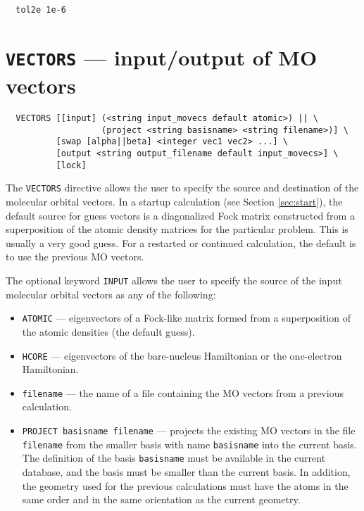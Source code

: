 \begin{verbatim}
  tol2e 1e-6
\end{verbatim}


\section{{\tt VECTORS} --- input/output of MO vectors}
\label{sec:vectors}


\begin{verbatim}
  VECTORS [[input] (<string input_movecs default atomic>) || \
                   (project <string basisname> <string filename>)] \
          [swap [alpha||beta] <integer vec1 vec2> ...] \
          [output <string output_filename default input_movecs>] \
          [lock]
\end{verbatim}

The \verb+VECTORS+ directive allows the user to specify the source and
destination of the molecular orbital vectors.  In a startup
calculation (see Section \ref{sec:start}), the default source for
guess vectors is a diagonalized Fock matrix constructed from a
superposition of the atomic density matrices for the particular
problem.  This is usually a very good guess.  For a restarted or
continued calculation, the default is to use the previous MO vectors.

The optional keyword \verb+INPUT+ allows the user to specify the
source of the input molecular orbital vectors as any of the following:
\begin{itemize}
\item \verb+ATOMIC+ --- eigenvectors of a Fock-like matrix formed from
  a superposition of the atomic densities (the default guess).
\item \verb+HCORE+ --- eigenvectors of the bare-nucleus Hamiltonian or
  the one-electron Hamiltonian.
\item \verb+filename+ --- the name of a file containing the MO vectors
  from a previous calculation.
\item \verb+PROJECT basisname filename+ --- projects the existing MO
  vectors in the file \verb+filename+ from the smaller basis with name
  \verb+basisname+ into the current basis.  The definition of the
  basis \verb+basisname+ must be available in the current database,
  and the basis must be smaller than the current basis.  In addition,
  the geometry used for the previous calculations must have the atoms
  in the same order and in the same orientation as the current
  geometry.
\end{itemize}
 
